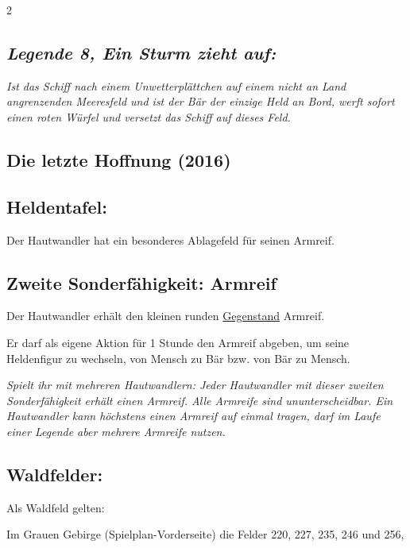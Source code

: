 \documentclass[10pt, a4paper, oneside]{book}
\newcommand{\fan}[1]{\textit{#1}}
\begin{document}
\begin{multicols*}{2}
\begin{bgcolor}
\subsection{\fan{Legende 8, Ein Sturm zieht auf:}}

\fan{Ist das Schiff nach einem Unwetterplättchen auf einem nicht an Land angrenzenden Meeresfeld und ist der Bär der einzige Held an Bord, werft sofort einen roten Würfel und versetzt das Schiff auf dieses Feld.}

\end{bgcolor}




\begin{bgcolor}
\section{Die letzte Hoffnung (2016)}


\subsection{Heldentafel:}

Der Hautwandler hat ein besonderes Ablagefeld für seinen Armreif.




\subsection{Zweite Sonderfähigkeit: Armreif}

Der Hautwandler erhält den kleinen runden \hyperref[gegenstaende-und-sonderplaettchen]{Gegenstand} Armreif.

Er darf als eigene Aktion für 1 Stunde den Armreif abgeben, um seine Heldenfigur zu wechseln, von Mensch zu Bär bzw. von Bär zu Mensch.
\supercite{dh11-heldenkarte-hautwandler}

\fan{Spielt ihr mit mehreren Hautwandlern: Jeder Hautwandler mit dieser zweiten Sonderfähigkeit erhält einen Armreif. Alle Armreife sind ununterscheidbar. Ein Hautwandler kann höchstens einen Armreif auf einmal tragen, darf im Laufe einer Legende aber mehrere Armreife nutzen.}



\subsection{Waldfelder:}

Als Waldfeld gelten:

\bullet{} Im Grauen Gebirge (Spielplan-Vorderseite) die Felder 220, 227, 235, 246 und 256,


\end{bgcolor}
\end{multicols*}
\end{document}
